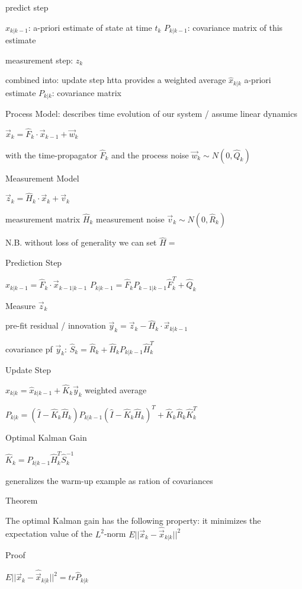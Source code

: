\documentclass{notebook}
\begin{document}
predict step

$\hat{x}_{k|k-1}$: a-priori estimate of state at time $t_{k}$
$P_{k|k-1}$: covariance matrix of this estimate

measurement step: $z_k$

combined into: update step htta provides a weighted average 
$\hat{x}_{k|k}$ a-priori estimate
$P_{k|k}$: covariance matrix


Process Model: describes time evolution of our system / assume linear dynamics

$\vec{x}_{k} = \hat{F}_{k} \cdot \vec{x}_{k-1} + \vec{w}_k$

with the time-propagator $\hat{F}_{k}$ and the process noise $\vec{w}_k \sim N(0,\hat{Q}_k)$

Measurement Model

$\vec{z}_k = \hat{H}_k \cdot \vec{x}_k + \vec{v}_k$

measurement matrix $\hat{H}_k$
measurement noise $\vec{v}_k \sim N(0,\hat{R}_k)$

N.B. without loss of generality we can set $\hat{H} = $

Prediction Step

$\hat{x}_{k|k-1} = \hat{F}_{k} \cdot \vec{x}_{k-1|k-1}$
$P_{k|k-1} = \hat{F}_{k} P_{k-1|k-1} \hat{F}^T_{k} + \hat{Q}_k$

Measure $\vec{z}_k$

pre-fit residual / innovation $\vec{y}_k = \vec{z}_k - \hat{H}_k \cdot \vec{x}_{k|k-1}$

covariance pf $\vec{y}_k$: $\hat{S}_k = \hat{R}_k + \hat{H}_k P_{k|k-1} \hat{H}^T_k$

Update Step

$\hat{x}_{k|k} = \hat{x}_{k|k-1} + \hat{K}_k \vec{y}_k$ weighted average

$P_{k|k} = (\hat{I} - \hat{K}_k \hat{H}_k) P_{k|k-1} (\hat{I} - \hat{K}_k \hat{H}_k)^T + \hat{K}_k \hat{R}_k \hat{K}^T_k$

Optimal Kalman Gain

$\hat{K}_k = P_{k|k-1} \hat{H}^T_k \hat{S}^{-1}_k$

generalizes the warm-up example as ration of covariances

Theorem

The optimal Kalman gain has the following property: it minimizes the expectation value of the $L^2$-norm $E || \vec{x}_k - \hat{\vec{x}}_{k|k} ||^2$

Proof

$E || \vec{x}_k - \hat{\vec{x}}_{k|k} ||^2 = tr \hat{P}_{k|k}$
\end{document}
